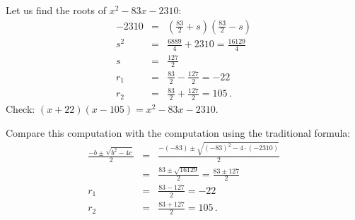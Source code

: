 \begin{example}
Let us find the roots of $x^2-83x-2310$:
\begin{eqnarray*}
-2310&=&\left(\frac{83}{2}+s\right)\left(\frac{83}{2} -s\right)\\
s^2&=&\frac{6889}{4}+2310=\frac{16129}{4}\\
s&=&\frac{127}{2}\\
r_1&=&\frac{83}{2}-\frac{127}{2}=-22\\
r_2&=&\frac{83}{2}+\frac{127}{2}=105\,.
\end{eqnarray*}
Check: $(x+22)(x-105)= x^2-83x-2310$.

\newpage

Compare this computation with the computation using the traditional  formula:
\begin{eqnarray*}
\frac{-b\pm\sqrt{b^2-4c}}{2}&=&\frac{-(-83)\pm\sqrt{(-83)^2-4\cdot (-2310)}}{2}\\
&=& \frac{83\pm\sqrt{16129}}{2} = \frac{83\pm 127}{2}\\
r_1&=&\frac{83-127}{2}=-22\\
r_2&=&\frac{83+127}{2}=105\,.
\end{eqnarray*}
\end{example}

